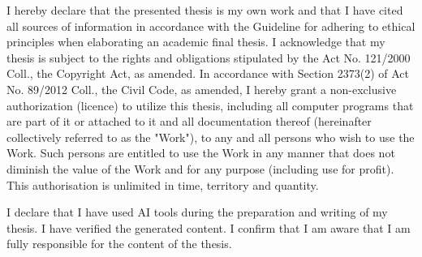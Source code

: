 \documentclass[english,bachelor,oneside]{ctufit-thesis}
\begin{document}
\begin{declarationpage}
    I hereby declare that the presented thesis is my own work and that I have cited all sources of
information in accordance with the Guideline for adhering to ethical principles when elaborating an
academic final thesis.
I acknowledge that my thesis is subject to the rights and obligations stipulated by the Act No.
121/2000 Coll., the Copyright Act, as amended. In accordance with Section 2373(2) of Act No.
89/2012 Coll., the Civil Code, as amended, I hereby grant a non-exclusive authorization (licence) to
utilize this thesis, including all computer programs that are part of it or attached to it and all
documentation thereof (hereinafter collectively referred to as the "Work"), to any and all persons
who wish to use the Work. Such persons are entitled to use the Work in any manner that does not
diminish the value of the Work and for any purpose (including use for profit). This authorisation is
unlimited in time, territory and quantity.

    I declare that I have used AI tools during the preparation and writing of my thesis. I have verified
the generated content. I confirm that I am aware that I am fully responsible for the content of the
thesis.
\end{declarationpage}

\printonepageabstract
\end{document}
